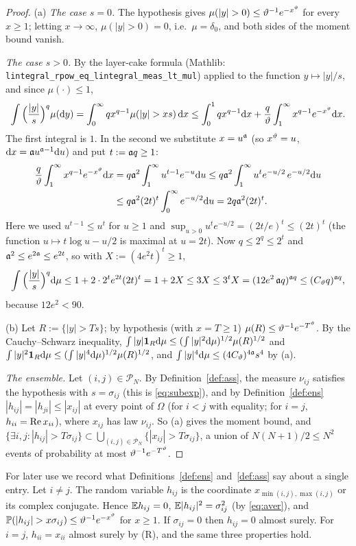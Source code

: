 \begin{proof}
(a) \emph{The case $s=0$.} The hypothesis gives $\mu(|y|>0)\le\vth^{-1}e^{-x^\vth}$ for every $x\ge1$; letting $x\to\infty$, $\mu(|y|>0)=0$, i.e.\ $\mu=\delta_0$, and both sides of the moment bound vanish.

\emph{The case $s>0$.} By the layer-cake formula (Mathlib: \texttt{lintegral\_rpow\_eq\_lintegral\_meas\_lt\_mul}) applied to the function $y\mapsto|y|/s$, and since $\mu(\cdot)\le1$,
\[
 \int\Big(\frac{|y|}s\Big)^q\mu(\rd y)=\int_0^\infty qx^{q-1}\mu(|y|>xs)\,\rd x\le\int_0^1qx^{q-1}\rd x+\frac q\vth\int_1^\infty x^{q-1}e^{-x^\vth}\rd x .
\]
The first integral is $1$. In the second we substitute $x=u^{\mathfrak{a}}$ (so $x^\vartheta=u$, $\mathrm{d} x=\mathfrak{a} u^{\mathfrak{a}-1}\mathrm{d} u$) and put $t:=\mathfrak{a} q\ge1$:
\begin{align*}
 \frac q{\vartheta}\int_1^\infty x^{q-1}e^{-x^\vartheta}\mathrm{d} x&=q\mathfrak{a}^2\int_1^\infty u^{t-1}e^{-u}\mathrm{d} u\le q\mathfrak{a}^2\int_1^\infty u^{t}e^{-u/2}\,e^{-u/2}\mathrm{d} u\\
 &\le q\mathfrak{a}^2(2t)^t\int_0^\infty e^{-u/2}\mathrm{d} u=2q\mathfrak{a}^2(2t)^t .
\end{align*}
Here we used $u^{t-1}\le u^t$ for $u\ge1$ and $\sup_{u>0}u^te^{-u/2}=(2t/e)^t\le(2t)^t$ (the function $u\mapsto t\log u-u/2$ is maximal at $u=2t$).
Now $q\le2^q\le2^{t}$ and $\mathfrak{a}^2\le e^{2\mathfrak{a}}\le e^{2t}$, so with $X:=(4e^2t)^t\ge1$,
\[
 \int\Big(\frac{|y|}s\Big)^q\mathrm{d}\mu\le1+2\cdot2^te^{2t}(2t)^t=1+2X\le3X\le3^tX=(12e^2\,\mathfrak{a} q)^{\mathfrak{a} q}\le(C_\vartheta q)^{\mathfrak{a} q},
\]
because $12e^2<90$.

(b) Let $R:=\{|y|>Ts\}$; by hypothesis (with $x=T\ge1$) $\mu(R)\le\vartheta^{-1}e^{-T^\vartheta}$. By the Cauchy--Schwarz inequality,
$\int|y|\mathbf{1}_R\mathrm{d}\mu\le(\int|y|^2\mathrm{d}\mu)^{1/2}\mu(R)^{1/2}$ and $\int|y|^2\mathbf{1}_R\mathrm{d}\mu\le(\int|y|^4\mathrm{d}\mu)^{1/2}\mu(R)^{1/2}$, and $\int|y|^4\mathrm{d}\mu\le(4C_\vartheta)^{4\mathfrak{a}}s^4$ by (a).

\emph{The ensemble.} Let $(i,j)\in\mathcal P_N$. By Definition~\ref{def:ass}, the measure $\nu_{ij}$ satisfies the hypothesis with $s=\sigma_{ij}$ (this is \eqref{eq:subexp}), and by Definition~\ref{def:ens}
$|h_{ij}|=|h_{ji}|\le|x_{ij}|$ at every point of $\Omega$ (for $i<j$ with equality; for $i=j$, $h_{ii}=\operatorname{Re} x_{ii}$), where $x_{ij}$ has law $\nu_{ij}$. So (a) gives the moment bound, and
$\{\exists i,j:|h_{ij}|>T\sigma_{ij}\}\subset\bigcup_{(i,j)\in\mathcal P_N}\{|x_{ij}|>T\sigma_{ij}\}$, a union of $N(N+1)/2\le N^2$ events of probability at most $\vartheta^{-1}e^{-T^\vartheta}$.
\end{proof}
\begin{remark}\label{rem:laws}
For later use we record what Definitions~\ref{def:ens} and~\ref{def:ass} say about a single entry. Let $i\ne j$. The random variable $h_{ij}$ is the coordinate $x_{\min(i,j),\max(i,j)}$ or its complex conjugate. Hence
$\mathbb{E} h_{ij}=0$, $\mathbb{E}|h_{ij}|^2=\sigma_{ij}^2$ (by \eqref{eq:aver}), and $\PP(|h_{ij}|>x\sigma_{ij})\le\vth^{-1}e^{-x^\vth}$ for $x\ge1$. If $\sigma_{ij}=0$ then $h_{ij}=0$ almost surely.
For $i=j$, $h_{ii}=x_{ii}$ almost surely by \textup{(R)}, and the same three properties hold.
\end{remark}
